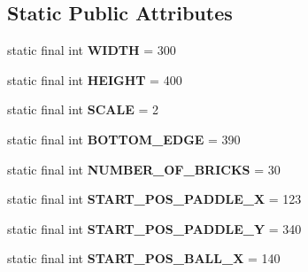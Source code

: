 \subsection*{Static Public Attributes}
\begin{DoxyCompactItemize}
\item 
static final int {\bfseries W\+I\+D\+TH} = 300\hypertarget{interface_main_1_1_constants_aceeaa8dcf3007d8fb01887b7e1d9d5f1}{}\label{interface_main_1_1_constants_aceeaa8dcf3007d8fb01887b7e1d9d5f1}

\item 
static final int {\bfseries H\+E\+I\+G\+HT} = 400\hypertarget{interface_main_1_1_constants_a20e624d65ef606988bf216536879e92e}{}\label{interface_main_1_1_constants_a20e624d65ef606988bf216536879e92e}

\item 
static final int {\bfseries S\+C\+A\+LE} = 2\hypertarget{interface_main_1_1_constants_a5b60bd784179d0dcf0e411c7d1989f2b}{}\label{interface_main_1_1_constants_a5b60bd784179d0dcf0e411c7d1989f2b}

\item 
static final int {\bfseries B\+O\+T\+T\+O\+M\+\_\+\+E\+D\+GE} = 390\hypertarget{interface_main_1_1_constants_a1b98791e45fc64b1d39f1ff475c1ad6b}{}\label{interface_main_1_1_constants_a1b98791e45fc64b1d39f1ff475c1ad6b}

\item 
static final int {\bfseries N\+U\+M\+B\+E\+R\+\_\+\+O\+F\+\_\+\+B\+R\+I\+C\+KS} = 30\hypertarget{interface_main_1_1_constants_acf733ef17154953ae3b34ed500ef95f4}{}\label{interface_main_1_1_constants_acf733ef17154953ae3b34ed500ef95f4}

\item 
static final int {\bfseries S\+T\+A\+R\+T\+\_\+\+P\+O\+S\+\_\+\+P\+A\+D\+D\+L\+E\+\_\+X} = 123\hypertarget{interface_main_1_1_constants_a793d44c56e3dbefda3d0f7b625f9327a}{}\label{interface_main_1_1_constants_a793d44c56e3dbefda3d0f7b625f9327a}

\item 
static final int {\bfseries S\+T\+A\+R\+T\+\_\+\+P\+O\+S\+\_\+\+P\+A\+D\+D\+L\+E\+\_\+Y} = 340\hypertarget{interface_main_1_1_constants_adb7f0a7fae200b50cf3e985a34ce34a6}{}\label{interface_main_1_1_constants_adb7f0a7fae200b50cf3e985a34ce34a6}

\item 
static final int {\bfseries S\+T\+A\+R\+T\+\_\+\+P\+O\+S\+\_\+\+B\+A\+L\+L\+\_\+X} = 140\hypertarget{interface_main_1_1_constants_a8c2ae8584f22b06303575577ef109624}{}\label{interface_main_1_1_constants_a8c2ae8584f22b06303575577ef109624}


\end{DoxyCompactItemize}
